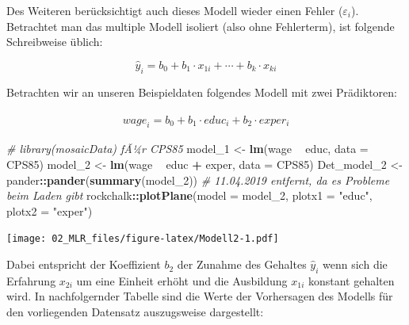 \documentclass[]{article}
\newenvironment{Shaded}{\begin{snugshade}}{\end{snugshade}}
\newcommand{\CommentTok}[1]{\textcolor[rgb]{0.56,0.35,0.01}{\textit{#1}}}
\newcommand{\DataTypeTok}[1]{\textcolor[rgb]{0.13,0.29,0.53}{#1}}
\newcommand{\DecValTok}[1]{\textcolor[rgb]{0.00,0.00,0.81}{#1}}
\newcommand{\KeywordTok}[1]{\textcolor[rgb]{0.13,0.29,0.53}{\textbf{#1}}}
\newcommand{\NormalTok}[1]{#1}
\newcommand{\OperatorTok}[1]{\textcolor[rgb]{0.81,0.36,0.00}{\textbf{#1}}}
\newcommand{\StringTok}[1]{\textcolor[rgb]{0.31,0.60,0.02}{#1}}
\begin{document}
Des Weiteren berücksichtigt auch dieses Modell wieder einen Fehler (\(\varepsilon_i\)). Betrachtet man das multiple Modell isoliert (also ohne Fehlerterm), ist folgende Schreibweise üblich:

\begin{equation} 
  \hat{y}_i = b_0 + b_1 \cdot x_{1i} + \cdots + b_k \cdot x_{ki}
  \label{eq:LinModMult}
\end{equation}

Betrachten wir an unseren Beispieldaten folgendes Modell mit zwei Prädiktoren:

\begin{eqnarray*} 
  \hat{wage}_i = b_0 + b_1 \cdot educ_{i} + b_2 \cdot exper_{i}
  \label{eq:LinModMultBsp}
\end{eqnarray*}

\begin{Shaded}
\begin{Highlighting}[]
  \CommentTok{# library(mosaicData) fÃ¼r CPS85}
\NormalTok{  model_}\DecValTok{1}\NormalTok{     <-}\StringTok{ }\KeywordTok{lm}\NormalTok{(wage }\OperatorTok{~}\StringTok{ }\NormalTok{educ, }\DataTypeTok{data =}\NormalTok{ CPS85)}
\NormalTok{  model_}\DecValTok{2}\NormalTok{     <-}\StringTok{ }\KeywordTok{lm}\NormalTok{(wage }\OperatorTok{~}\StringTok{ }\NormalTok{educ }\OperatorTok{+}\StringTok{ }\NormalTok{exper, }\DataTypeTok{data =}\NormalTok{ CPS85)}
\NormalTok{  Det_model_}\DecValTok{2}\NormalTok{ <-}\StringTok{ }\NormalTok{pander}\OperatorTok{::}\KeywordTok{pander}\NormalTok{(}\KeywordTok{summary}\NormalTok{(model_}\DecValTok{2}\NormalTok{))}
  \CommentTok{# 11.04.2019 entfernt, da es Probleme beim Laden gibt}
\NormalTok{  rockchalk}\OperatorTok{::}\KeywordTok{plotPlane}\NormalTok{(}\DataTypeTok{model =}\NormalTok{ model_}\DecValTok{2}\NormalTok{, }\DataTypeTok{plotx1 =} \StringTok{"educ"}\NormalTok{, }\DataTypeTok{plotx2 =} \StringTok{"exper"}\NormalTok{)}
\end{Highlighting}
\end{Shaded}

\texttt{[image: 02\_MLR\_files/figure-latex/Modell2-1.pdf]}

Dabei entspricht der Koeffizient \(b_2\) der Zunahme des Gehaltes \(\hat{y}_i\) wenn sich die Erfahrung \(x_{2i}\) um eine Einheit erhöht und die Ausbildung \(x_{1i}\) konstant gehalten wird. In nachfolgernder Tabelle sind die Werte der Vorhersagen des Modells für den vorliegenden Datensatz auszugsweise dargestellt:
\end{document}
